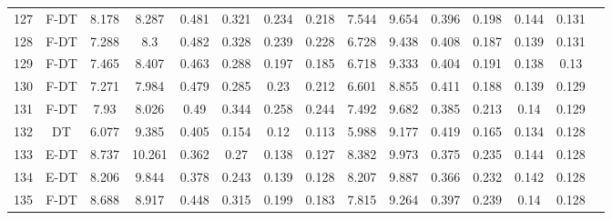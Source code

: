 \begin{longtable}{@{\hskip3pt}c@{\hskip3pt}c@{\hskip3pt}c@{\hskip3pt}c@{\hskip3pt}c@{\hskip3pt}c@{\hskip3pt}c@{\hskip3pt}c@{\hskip3pt}c@{\hskip3pt}c@{\hskip3pt}c@{\hskip3pt}c@{\hskip3pt}c@{\hskip3pt}c@{\hskip3pt}c}
        127 &           F-DT &             8.178 &          8.287 &           0.481 &           0.321 &           0.234 &           0.218 &               7.544 &           9.654 &           0.396 &         0.198 &          0.144 &           0.131 \\
        128 &           F-DT &             7.288 &            8.3 &           0.482 &           0.328 &           0.239 &           0.228 &               6.728 &           9.438 &           0.408 &         0.187 &          0.139 &           0.131 \\
        129 &           F-DT &             7.465 &          8.407 &           0.463 &           0.288 &           0.197 &           0.185 &               6.718 &           9.333 &           0.404 &         0.191 &          0.138 &            0.13 \\
        130 &           F-DT &             7.271 &          7.984 &           0.479 &           0.285 &            0.23 &           0.212 &               6.601 &           8.855 &           0.411 &         0.188 &          0.139 &           0.129 \\
        131 &           F-DT &              7.93 &          8.026 &            0.49 &           0.344 &           0.258 &           0.244 &               7.492 &           9.682 &           0.385 &         0.213 &           0.14 &           0.129 \\
        132 &             DT &             6.077 &          9.385 &           0.405 &           0.154 &            0.12 &           0.113 &               5.988 &           9.177 &           0.419 &         0.165 &          0.134 &           0.128 \\
        133 &           E-DT &             8.737 &         10.261 &           0.362 &            0.27 &           0.138 &           0.127 &               8.382 &           9.973 &           0.375 &         0.235 &          0.144 &           0.128 \\
        134 &           E-DT &             8.206 &          9.844 &           0.378 &           0.243 &           0.139 &           0.128 &               8.207 &           9.887 &           0.366 &         0.232 &          0.142 &           0.128 \\
        135 &           F-DT &             8.688 &          8.917 &           0.448 &           0.315 &           0.199 &           0.183 &               7.815 &           9.264 &           0.397 &         0.239 &           0.14 &           0.128 \\

\end{longtable}
